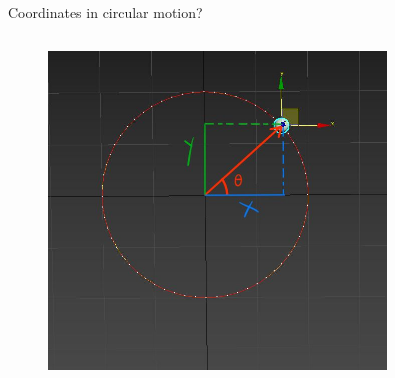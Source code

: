 \documentclass[]{beamer}
\begin{document}
 \begin{frame}

    Coordinates in circular motion?
    
 
        
   
 
           \begin{columns}[c]
             \column{2.3in}  %
  
           
 
             \column{2.5in}
             
       
             \begin{figure}[h!]  
                 \includegraphics[width=0.8\textwidth]{images/33.jpg}
             
               \end{figure}
               
               
               
                
          
             \end{columns}
 
 
 
      
        \end{frame}
\end{document}
